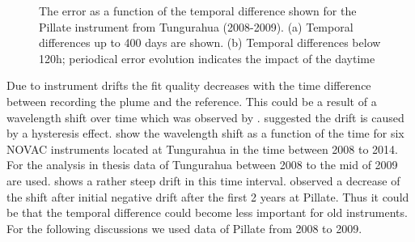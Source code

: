 \documentclass  [
  paper    = a4,
  BCOR     = 10mm,
  twoside,
  fontsize = 12pt,
  fleqn,
  toc      = bibnumbered,
  toc      = listofnumbered,
  numbers  = noendperiod,
  headings = normal,
  listof   = leveldown,
  version  = 3.03
]                                       {scrreprt}
\begin{document}
	\begin{figure}
		
		\caption{The   error as a function of the temporal difference shown for the Pillate instrument from Tungurahua (2008-2009). (a) Temporal differences up to 400 days are shown. (b) Temporal differences below 120h; periodical   error evolution indicates the impact of the daytime}
		\label{fig:dat}
	\end{figure}
	Due to instrument drifts the fit quality decreases with the time difference between recording the plume and the reference. This could be a result of a wavelength shift over time which was observed by \cite{WarnachSimon}. \cite{WarnachSimon} suggested the drift is caused by a hysteresis effect.  show the wavelength shift as a function of the time for six NOVAC instruments located at Tungurahua in the time between 2008 to 2014. For the analysis in thesis data of Tungurahua between 2008 to the mid of 2009 are used.  shows a rather steep drift in this time interval. \cite{WarnachSimon} observed a decrease of the shift after initial negative drift after the first 2 years at Pillate. Thus it could be that the temporal difference could become less important for old instruments. For the following discussions we used data of Pillate from 2008 to 2009.\\
\end{document}
